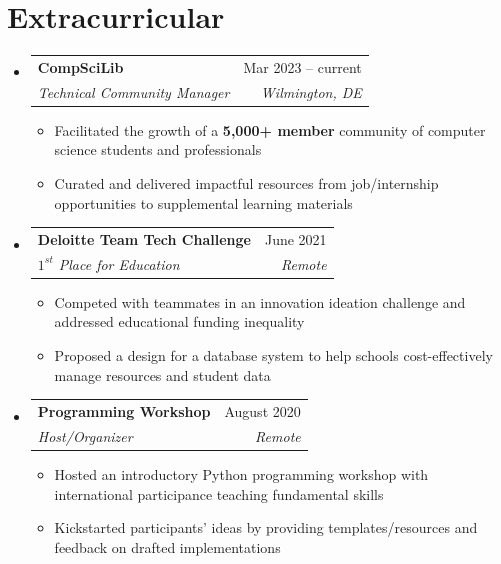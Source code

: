 \documentclass[letterpaper,11pt]{article}
\makeatletter
\newcommand{\resumeItem}[1]{
  \item\small{
    {#1 \vspace{-2pt}}
  }
}
\newcommand{\resumeSubheading}[4]{
  \vspace{-2pt}\item
    \begin{tabular*}{0.97\textwidth}[t]{l@{\extracolsep{\fill}}r}
      \textbf{#1} & #2 \\
      \textit{\small#3} & \textit{\small #4} \\
    \end{tabular*}\vspace{-7pt}
}
\newcommand{\resumeSubHeadingListStart}{\begin{itemize}[leftmargin=0.15in, label={}]}
\newcommand{\resumeSubHeadingListEnd}{\end{itemize}}
\newcommand{\resumeItemListStart}{\begin{itemize}}
\newcommand{\resumeItemListEnd}{\end{itemize}\vspace{-5pt}}
\makeatother
\begin{document}
\section{Extracurricular}

\resumeSubHeadingListStart
\resumeSubheading{CompSciLib}{Mar 2023 -- current}{Technical Community Manager}{Wilmington, DE}
\resumeItemListStart
\resumeItem{Facilitated the growth of a \textbf{5,000+ member} community of computer science students and professionals}
\resumeItem{Curated and delivered impactful resources from job/internship opportunities to supplemental learning materials}
\resumeItemListEnd

\resumeSubheading{Deloitte Team Tech Challenge}{June 2021}{$1^{st}$ Place for Education}{Remote}
\resumeItemListStart
\resumeItem{Competed with teammates in an innovation ideation challenge and addressed educational funding inequality}
\resumeItem{Proposed a design for a database system to help schools cost-effectively manage resources and student data}
\resumeItemListEnd
\resumeSubheading{Programming Workshop}{August 2020}{Host/Organizer}{Remote}
\resumeItemListStart

\resumeItem{Hosted an introductory Python programming workshop with international participance teaching fundamental skills}
\resumeItem{Kickstarted participants' ideas by providing templates/resources and feedback on drafted implementations}
\resumeItemListEnd

\resumeSubHeadingListEnd
\vspace{-10pt}
\end{document}
